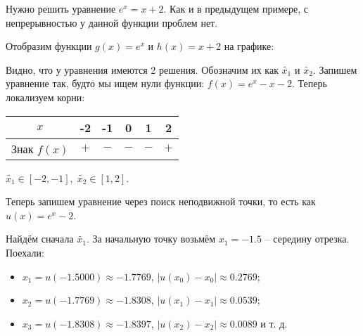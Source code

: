 \documentclass[main.tex]{subfile}
\begin{document}
\begin{example}
	Нужно решить уравнение \(e^x=x+2.\) Как и в предыдущем примере, с
	непрерывностью у данной функции проблем нет.

	Отобразим функции $g(x)=e^x$ и $h(x)=x+2$ на графике:
	\newline

	\newline

	Видно, что у уравнения имеются 2 решения. Обозначим их как $\widetilde{x_1}$
	и $\widetilde{x_2}$. Запишем уравнение так, будто мы ищем нули функции:
	$f(x) = e^x-x-2$. Теперь локализуем корни:
	\newline

	\begin{tabular}{ |c|c|c|c|c|c| }
		\hline
		$x$		& -2	& -1	& 0	& 1	& 2 \\
		\hline
		Знак $f(x)$ 	& $+$	& $-$	& $-$	& $-$ 	& $+$\\
		\hline
	\end{tabular}
	\newline

	$\widetilde{x_1}\in[-2,-1],\;\widetilde{x_2}\in[1,2]$.

	\newpage
	Теперь запишем уравнение через поиск неподвижной точки, то есть как
	$u(x)=e^x-2$.

	Найдём сначала $\widetilde{x_1}$. За начальную точку возьмём $x_1=-1.5$ --
	середину отрезка. Поехали:
	\begin{itemize}
		\item $x_1=u(-1.5000)\approx -1.7769$, $|u(x_0)-x_0|\approx 0.2769$;
		\item $x_2=u(-1.7769)\approx -1.8308$, $|u(x_1)-x_1|\approx 0.0539$;
		\item $x_3=u(-1.8308)\approx -1.8397$, $|u(x_2)-x_2|\approx 0.0089$ и т. д.
	\end{itemize}


\end{example}
\end{document}

